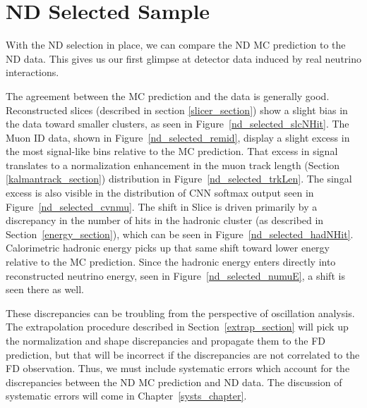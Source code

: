 \section{ND Selected Sample}
\label{nd_selection_section}

With the ND selection in place, we can compare the ND MC prediction
to the ND data.
This gives us our first glimpse at detector data induced
by real neutrino interactions.

The agreement between the MC prediction and the data is generally good.
Reconstructed slices (described in section \ref{slicer_section})
show a slight bias in the data toward smaller clusters, as seen in
Figure~\ref{nd_selected_slcNHit}.
The Muon ID data, shown in Figure~\ref{nd_selected_remid}, display
a slight excess in the most signal-like bins relative to the MC prediction.
That excess in signal translates to a normalization enhancement in the
muon track length (Section \ref{kalmantrack_section})
distribution in Figure~\ref{nd_selected_trkLen}.
The singal excess is also visible in the distribution of CNN softmax output
seen in Figure~\ref{nd_selected_cvnmu}.
The shift in Slice \nhit is driven primarily by a discrepancy
in the number of hits in the hadronic cluster (as described in
Section~\ref{energy_section}), which can be seen in Figure~\ref{nd_selected_hadNHit}.
Calorimetric hadronic energy picks up that same shift toward lower energy
relative to the MC prediction.
Since the hadronic energy enters directly into reconstructed neutrino energy,
seen in Figure~\ref{nd_selected_numuE}, a shift is seen there as well.

These discrepancies can be troubling from the perspective of oscillation
analysis.
The extrapolation procedure described in Section~\ref{extrap_section}
will pick up the normalization and shape discrepancies and propagate them
to the FD prediction, but that will be incorrect if the discrepancies
are not correlated to the FD observation.
Thus, we must include systematic errors which account for the discrepancies
between the ND MC prediction and ND data.
The discussion of systematic errors will come in Chapter~\ref{systs_chapter}.

